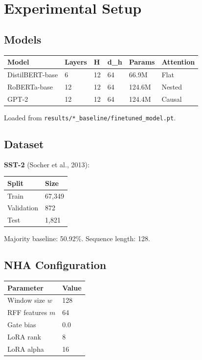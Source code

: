 
\section{Experimental Setup}

\subsection{Models}

\begin{table}[H]
\centering
\small
\begin{tabular}{llllll}
\toprule
\textbf{Model} & \textbf{Layers} & \textbf{H} & \textbf{d\_h} & \textbf{Params} & \textbf{Attention} \\
\midrule
DistilBERT-base & 6 & 12 & 64 & 66.9M & Flat \\
RoBERTa-base & 12 & 12 & 64 & 124.6M & Nested \\
GPT-2 & 12 & 12 & 64 & 124.4M & Causal \\
\bottomrule
\end{tabular}
\end{table}

Loaded from \texttt{results/*\_baseline/finetuned\_model.pt}.

\subsection{Dataset}

\textbf{SST-2} (Socher et al., 2013):

\begin{table}[H]
\centering
\small
\begin{tabular}{ll}
\toprule
\textbf{Split} & \textbf{Size} \\
\midrule
Train & 67,349 \\
Validation & 872 \\
Test & 1,821 \\
\bottomrule
\end{tabular}
\end{table}

Majority baseline: 50.92\%. Sequence length: 128.

\subsection{NHA Configuration}

\begin{table}[H]
\centering
\small
\begin{tabular}{ll}
\toprule
\textbf{Parameter} & \textbf{Value} \\
\midrule
Window size $w$ & 128 \\
RFF features $m$ & 64 \\
Gate bias & 0.0 \\
LoRA rank & 8 \\
LoRA alpha & 16 \\
\bottomrule
\end{tabular}
\end{table}

